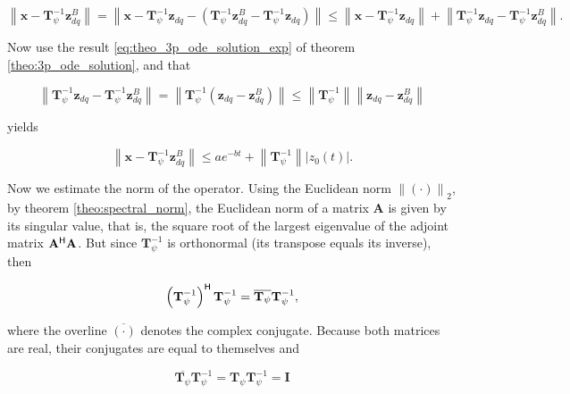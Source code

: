 \begin{equation} \left\lVert \mathbf{x} - \mathbf{T}^{-1}_\psi \mathbf{z}_{dq}^B \right\rVert = \left\lVert \mathbf{x} - \mathbf{T}^{-1}_\psi \mathbf{z}_{dq} - \left(\mathbf{T}^{-1}_\psi \mathbf{z}_{dq}^B - \mathbf{T}^{-1}_\psi \mathbf{z}_{dq}\right) \right\rVert \leq  \left\lVert \mathbf{x} - \mathbf{T}^{-1}_\psi\mathbf{z}_{dq} \right\rVert + \left\lVert\mathbf{T}^{-1}_\psi \mathbf{z}_{dq} - \mathbf{T}^{-1}_\psi\mathbf{z}_{dq}^B \right\rVert . \label{eq:balanced_3p_ode_solution_eq4}\end{equation}

	Now use the result \eqref{eq:theo_3p_ode_solution_exp} of theorem \ref{theo:3p_ode_solution}, and that

\begin{equation} \left\lVert\mathbf{T}^{-1}_\psi \mathbf{z}_{dq} - \mathbf{T}^{-1}_\psi\mathbf{z}_{dq}^B \right\rVert = \left\lVert\mathbf{T}^{-1}_\psi\left(\mathbf{z}_{dq} - \mathbf{z}_{dq}^B\right) \right\rVert \leq \left\lVert\mathbf{T}^{-1}_\psi \right\rVert \left\lVert\mathbf{z}_{dq} - \mathbf{z}_{dq}^B \right\rVert \end{equation}

	\noindent yields

\begin{equation} \left\lVert \mathbf{x} - \mathbf{T}^{-1}_\psi \mathbf{z}_{dq}^B \right\rVert \leq ae^{-bt} + \left\lVert\mathbf{T}^{-1}_\psi \right\rVert\left\lvert z_0(t)\right\rvert . \label{q:balanced_3p_ode_solution_eq4}\end{equation}

	Now we estimate the norm of the operator. Using the Euclidean norm $\left\lVert \left(\cdot\right)\right\rVert_2$, by theorem \ref{theo:spectral_norm}, the Euclidean norm of a matrix $\mathbf{A}$ is given by its singular value, that is, the square root of the largest eigenvalue of the adjoint matrix $\mathbf{A}^{\mathsf{H}} \mathbf{A}$. But since $\mathbf{T}^{-1}_\psi$ is orthonormal (its transpose equals its inverse), then 

\begin{equation} \left(\mathbf{T}^{-1}_\psi\right)^{\mathsf{H}} \mathbf{T}^{-1}_\psi = \overline{\mathbf{T}_\psi} \mathbf{T}^{-1}_\psi , \end{equation}

	\noindent where the overline $\overline{\left(\cdot\right)}$ denotes the complex conjugate. Because both matrices are real, their conjugates are equal to themselves and

\begin{equation} \overline{\mathbf{T}_\psi} \mathbf{T}^{-1}_\psi = \mathbf{T}_\psi \mathbf{T}^{-1}_\psi = \mathbf{I}\end{equation}

